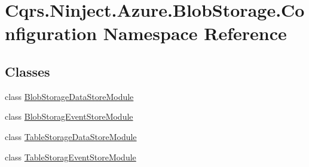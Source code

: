 \hypertarget{namespaceCqrs_1_1Ninject_1_1Azure_1_1BlobStorage_1_1Configuration}{}\section{Cqrs.\+Ninject.\+Azure.\+Blob\+Storage.\+Configuration Namespace Reference}
\label{namespaceCqrs_1_1Ninject_1_1Azure_1_1BlobStorage_1_1Configuration}
\subsection*{Classes}
\begin{DoxyCompactItemize}
\item 
class \hyperlink{classCqrs_1_1Ninject_1_1Azure_1_1BlobStorage_1_1Configuration_1_1BlobStorageDataStoreModule}{Blob\+Storage\+Data\+Store\+Module}
\item 
class \hyperlink{classCqrs_1_1Ninject_1_1Azure_1_1BlobStorage_1_1Configuration_1_1BlobStoragEventStoreModule}{Blob\+Storag\+Event\+Store\+Module}
\item 
class \hyperlink{classCqrs_1_1Ninject_1_1Azure_1_1BlobStorage_1_1Configuration_1_1TableStorageDataStoreModule}{Table\+Storage\+Data\+Store\+Module}
\item 
class \hyperlink{classCqrs_1_1Ninject_1_1Azure_1_1BlobStorage_1_1Configuration_1_1TableStoragEventStoreModule}{Table\+Storag\+Event\+Store\+Module}
\end{DoxyCompactItemize}

